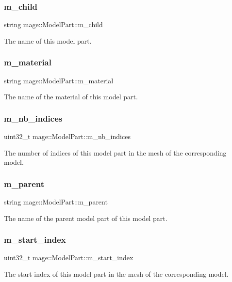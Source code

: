 \subsubsection{\texorpdfstring{m\+\_\+child}{m\_child}}
{\footnotesize\ttfamily string mage\+::\+Model\+Part\+::m\+\_\+child}

The name of this model part. \hypertarget{structmage_1_1_model_part_a606603dd01b895cb1aa91b51089bf27f}{}\label{structmage_1_1_model_part_a606603dd01b895cb1aa91b51089bf27f} 
\subsubsection{\texorpdfstring{m\+\_\+material}{m\_material}}
{\footnotesize\ttfamily string mage\+::\+Model\+Part\+::m\+\_\+material}

The name of the material of this model part. \hypertarget{structmage_1_1_model_part_a3944ee7b1bf9a91fd87eefb1cf3c79bc}{}\label{structmage_1_1_model_part_a3944ee7b1bf9a91fd87eefb1cf3c79bc} 
\subsubsection{\texorpdfstring{m\+\_\+nb\+\_\+indices}{m\_nb\_indices}}
{\footnotesize\ttfamily uint32\+\_\+t mage\+::\+Model\+Part\+::m\+\_\+nb\+\_\+indices}

The number of indices of this model part in the mesh of the corresponding model. \hypertarget{structmage_1_1_model_part_ad4754bbb69d28885c09cef591d4d96c5}{}\label{structmage_1_1_model_part_ad4754bbb69d28885c09cef591d4d96c5} 
\subsubsection{\texorpdfstring{m\+\_\+parent}{m\_parent}}
{\footnotesize\ttfamily string mage\+::\+Model\+Part\+::m\+\_\+parent}

The name of the parent model part of this model part. \hypertarget{structmage_1_1_model_part_ac4f520d8284b4af7f20f94b116f7afed}{}\label{structmage_1_1_model_part_ac4f520d8284b4af7f20f94b116f7afed} 
\subsubsection{\texorpdfstring{m\+\_\+start\+\_\+index}{m\_start\_index}}
{\footnotesize\ttfamily uint32\+\_\+t mage\+::\+Model\+Part\+::m\+\_\+start\+\_\+index}

The start index of this model part in the mesh of the corresponding model. 